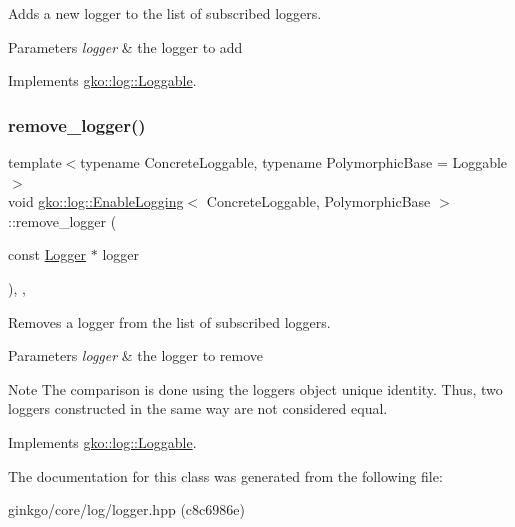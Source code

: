 Adds a new logger to the list of subscribed loggers. 


\begin{DoxyParams}{Parameters}
{\em logger} & the logger to add \\
\hline
\end{DoxyParams}


Implements \hyperlink{classgko_1_1log_1_1Loggable_aa2bb887b5ef7e75fa1a30ee1896ed932}{gko\+::log\+::\+Loggable}.

\mbox{\label{classgko_1_1log_1_1EnableLogging_aba5317f8a03956a61d770e9b07fc65cc}} 
\subsubsection{\texorpdfstring{remove\+\_\+logger()}{remove\_logger()}}
{\footnotesize\ttfamily template$<$typename Concrete\+Loggable, typename Polymorphic\+Base = Loggable$>$ \\
void \hyperlink{classgko_1_1log_1_1EnableLogging}{gko\+::log\+::\+Enable\+Logging}$<$ Concrete\+Loggable, Polymorphic\+Base $>$\+::remove\+\_\+logger (\begin{DoxyParamCaption}\item[{const \hyperlink{classgko_1_1log_1_1Logger}{Logger} $\ast$}]{logger }\end{DoxyParamCaption})\hspace{0.3cm}{\ttfamily [inline]}, {\ttfamily [override]}, {\ttfamily [virtual]}}



Removes a logger from the list of subscribed loggers. 


\begin{DoxyParams}{Parameters}
{\em logger} & the logger to remove\\
\hline
\end{DoxyParams}
\begin{DoxyNote}{Note}
The comparison is done using the logger\textquotesingle{}s object unique identity. Thus, two loggers constructed in the same way are not considered equal. 
\end{DoxyNote}


Implements \hyperlink{classgko_1_1log_1_1Loggable_a5de4092a74cf04f30f13636d49aaec8b}{gko\+::log\+::\+Loggable}.



The documentation for this class was generated from the following file\+:\begin{DoxyCompactItemize}
\item 
ginkgo/core/log/logger.\+hpp (c8c6986e)\end{DoxyCompactItemize}
